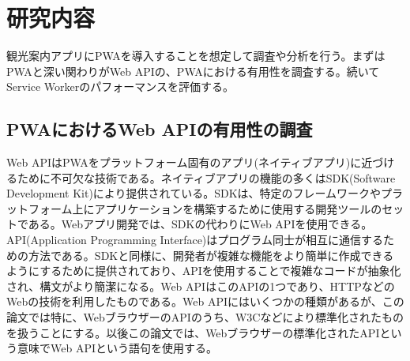 \section{研究内容}\label{section:研究内容}
観光案内アプリにPWAを導入することを想定して調査や分析を行う。まずはPWAと深い関わりがWeb APIの、PWAにおける有用性を調査する。続いてService Workerのパフォーマンスを評価する。
\subsection{PWAにおけるWeb APIの有用性の調査}\label{subsection:PWAにおけるWeb APIの有用性の調査}
Web APIはPWAをプラットフォーム固有のアプリ(ネイティブアプリ)に近づけるために不可欠な技術である。ネイティブアプリの機能の多くはSDK(Software Development Kit)により提供されている。SDKは、特定のフレームワークやプラットフォーム上にアプリケーションを構築するために使用する開発ツールのセットである。Webアプリ開発では、SDKの代わりにWeb APIを使用できる。API(Application Programming Interface)はプログラム同士が相互に通信するための方法である。SDKと同様に、開発者が複雑な機能をより簡単に作成できるようにするために提供されており、APIを使用することで複雑なコードが抽象化され、構文がより簡潔になる。Web APIはこのAPIの1つであり、HTTPなどのWebの技術を利用したものである。Web APIにはいくつかの種類があるが、この論文では特に、WebブラウザーのAPIのうち、W3Cなどにより標準化されたものを扱うことにする。以後この論文では、Webブラウザーの標準化されたAPIという意味でWeb APIという語句を使用する。
